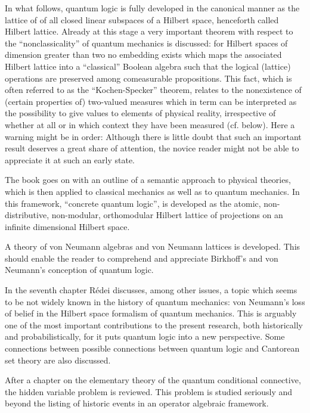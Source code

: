 In what follows, quantum logic is fully developed in the canonical
manner
as the lattice of of all closed linear subspaces of a Hilbert space,
henceforth called Hilbert lattice. Already at this stage a very
important theorem with respect to the ``nonclassicality'' of quantum
mechanics is discussed: for Hilbert spaces of dimension greater than two
no embedding exists which maps the associated Hilbert lattice into a
``classical'' Boolean algebra such that the logical (lattice) operations
are preserved among comeasurable propositions. This fact, which is often
referred to as the ``Kochen-Specker'' theorem, relates to the
nonexistence of (certain properties of) two-valued measures which in
term can be interpreted as the possibility to give values to elements
of physical reality, irrespective of whether at all or in which context
they have been measured (cf. below). Here a warning might be in order:
Although there is little
doubt that such an important result
deserves a great share of attention,   the novice
reader might not be able to appreciate it at such an early state.

The book goes on with an outline of a semantic approach to
physical theories, which is then
applied to classical mechanics as well as to quantum mechanics.
In this framework, ``concrete
quantum logic'',  is developed as the atomic, non-distributive,
non-modular, orthomodular Hilbert lattice of projections on an infinite
dimensional Hilbert space.

A theory of von Neumann algebras and von Neumann lattices is
developed. This should enable the reader to comprehend and appreciate
Birkhoff's and von Neumann's conception of quantum logic.

In the seventh chapter
R{\'{e}}dei discusses, among other issues, a topic which seems to be not
widely known
in the history of quantum mechanics: von Neumann's loss of belief in the
Hilbert space formalism of quantum mechanics. This is
arguably one of the most important contributions to the present
research, both
historically and probabilistically, for it puts quantum logic into a
new perspective.
Some connections between possible connections between quantum logic and
Cantorean set theory are also discussed.

After a chapter on the elementary theory of the quantum conditional
connective, the hidden variable problem is reviewed. This problem is
studied seriously and beyond the listing of historic events in
an operator algebraic framework.

